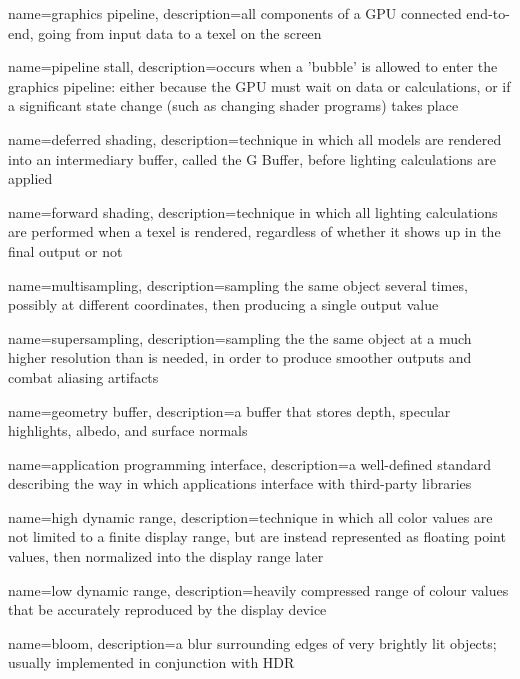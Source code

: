  {
  name=graphics pipeline,
  description={all components of a \gls{GPU} connected end-to-end, going from input data to a \gls{texel} on the screen}
}

 {
  name=pipeline stall,
  description={occurs when a 'bubble' is allowed to enter the \gls{graphics pipeline}: either because the \gls{GPU} must wait on data or calculations, or if a significant state change (such as changing \gls{shader} programs) takes place}
}

 {
  name=deferred shading,
  description={technique in which all models are rendered into an intermediary buffer, called the \gls{G Buffer}, before lighting calculations are applied}
}

 {
  name=forward shading,
  description={technique in which all lighting calculations are performed when a texel is rendered, regardless of whether it shows up in the final output or not}
}

 {
  name=multisampling,
  description={sampling the same object several times, possibly at different coordinates, then producing a single output value}
}

 {
  name=supersampling,
  description={sampling the the same object at a much higher resolution than is needed, in order to produce smoother outputs and combat aliasing artifacts}
}

 {
  name=geometry buffer,
  description={a buffer that stores depth, specular highlights, albedo, and surface normals}
}

 {
  name=application programming interface,
  description={a well-defined standard describing the way in which applications interface with third-party libraries}
}

 {
  name=high dynamic range,
  description={technique in which all color values are not limited to a finite display range, but are instead represented as \gls{floating point} values, then normalized into the display range later}
}

 {
  name=low dynamic range,
  description={heavily compressed range of colour values that be accurately reproduced by the display device}
}

 {
  name=bloom,
  description={a blur surrounding edges of very brightly lit objects; usually implemented in conjunction with \gls{HDR}}
}

